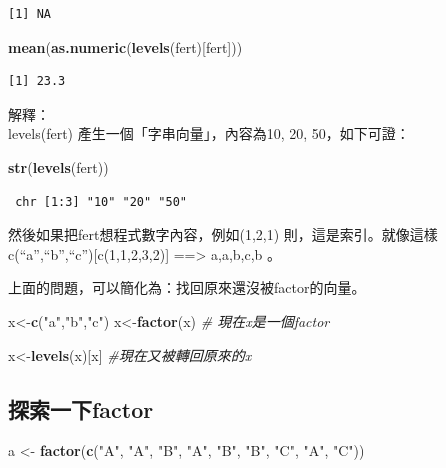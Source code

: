 \documentclass[]{book}
\newenvironment{Shaded}{\begin{snugshade}}{\end{snugshade}}
\newcommand{\CommentTok}[1]{\textcolor[rgb]{0.56,0.35,0.01}{\textit{#1}}}
\newcommand{\KeywordTok}[1]{\textcolor[rgb]{0.13,0.29,0.53}{\textbf{#1}}}
\newcommand{\NormalTok}[1]{#1}
\newcommand{\StringTok}[1]{\textcolor[rgb]{0.31,0.60,0.02}{#1}}
\theoremstyle{definition}
\theoremstyle{definition}
\theoremstyle{definition}
\theoremstyle{remark}
\begin{document}
\begin{verbatim}
[1] NA
\end{verbatim}

\begin{Shaded}
\begin{Highlighting}[]
\KeywordTok{mean}\NormalTok{(}\KeywordTok{as.numeric}\NormalTok{(}\KeywordTok{levels}\NormalTok{(fert)[fert]))}
\end{Highlighting}
\end{Shaded}

\begin{verbatim}
[1] 23.3
\end{verbatim}

解釋：\\
levels(fert) 產生一個「字串向量」，內容為10, 20, 50，如下可證：

\begin{Shaded}
\begin{Highlighting}[]
\KeywordTok{str}\NormalTok{(}\KeywordTok{levels}\NormalTok{(fert))}
\end{Highlighting}
\end{Shaded}

\begin{verbatim}
 chr [1:3] "10" "20" "50"
\end{verbatim}

然後如果把fert想程式數字內容，例如(1,2,1) 則，這是索引。就像這樣\\
c(``a'',``b'',``c''){[}c(1,1,2,3,2){]} ==\textgreater{} a,a,b,c,b 。

上面的問題，可以簡化為：找回原來還沒被factor的向量。

\begin{Shaded}
\begin{Highlighting}[]
\NormalTok{x<-}\KeywordTok{c}\NormalTok{(}\StringTok{"a"}\NormalTok{,}\StringTok{"b"}\NormalTok{,}\StringTok{"c"}\NormalTok{)}
\NormalTok{x<-}\KeywordTok{factor}\NormalTok{(x) }\CommentTok{# 現在x是一個factor}

\NormalTok{x<-}\KeywordTok{levels}\NormalTok{(x)[x] }\CommentTok{#現在又被轉回原來的x}
\end{Highlighting}
\end{Shaded}

\hypertarget{factor}{%
\subsection{探索一下factor}\label{factor}}

\begin{Shaded}
\begin{Highlighting}[]
\NormalTok{a <-}\StringTok{ }\KeywordTok{factor}\NormalTok{(}\KeywordTok{c}\NormalTok{(}\StringTok{"A"}\NormalTok{, }\StringTok{"A"}\NormalTok{, }\StringTok{"B"}\NormalTok{, }\StringTok{"A"}\NormalTok{, }\StringTok{"B"}\NormalTok{, }\StringTok{"B"}\NormalTok{, }\StringTok{"C"}\NormalTok{, }\StringTok{"A"}\NormalTok{, }\StringTok{"C"}\NormalTok{))}
\end{Highlighting}
\end{Shaded}
\end{document}
